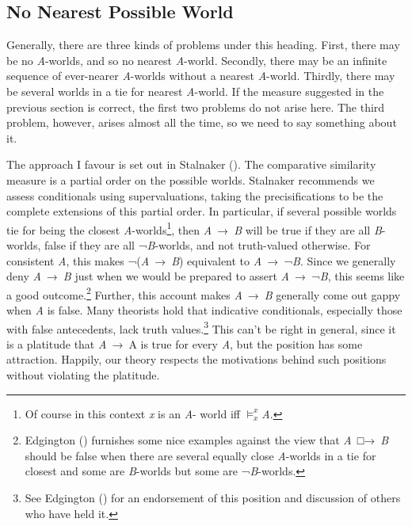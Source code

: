 \documentclass[
  10pt,
  letterpaper,
  DIV=11,
  numbers=noendperiod,
  twoside]{scrartcl}
\begin{document}
\subsection{No Nearest Possible World}\label{no-nearest-possible-world}

Generally, there are three kinds of problems under this heading. First,
there may be no \emph{A}-worlds, and so no nearest \emph{A}-world.
Secondly, there may be an infinite sequence of ever-nearer
\emph{A}-worlds without a nearest \emph{A}-world. Thirdly, there may be
several worlds in a tie for nearest \emph{A}-world. If the measure
suggested in the previous section is correct, the first two problems do
not arise here. The third problem, however, arises almost all the time,
so we need to say something about it.

The approach I favour is set out in Stalnaker
(). The comparative similarity measure
is a partial order on the possible worlds. Stalnaker recommends we
assess conditionals using supervaluations, taking the precisifications
to be the complete extensions of this partial order. In particular, if
several possible worlds tie for being the closest
\emph{A}-worlds\footnote{Of course in this context \emph{x} is an
  \emph{A}- world iff \(\vDash_x^x\)\emph{A}.}, then \emph{A}~→~\emph{B}
will be true if they are all \emph{B}-worlds, false if they are all
¬\emph{B}-worlds, and not truth-valued otherwise. For consistent
\emph{A}, this makes ¬(\emph{A}~→~\emph{B}) equivalent to
\emph{A}~→~¬\emph{B}. Since we generally deny \emph{A}~→~\emph{B} just
when we would be prepared to assert \emph{A}~→~¬\emph{B}, this seems
like a good outcome.\footnote{Edgington
  () furnishes some nice examples
  against the view that \emph{A}~□→~\emph{B} should be false when there
  are several equally close \emph{A}-worlds in a tie for closest and
  some are \emph{B}-worlds but some are ¬\emph{B}-worlds.} Further, this
account makes \emph{A}~→~\emph{B} generally come out gappy when \emph{A}
is false. Many theorists hold that indicative conditionals, especially
those with false antecedents, lack truth values.\footnote{See Edgington
  () for an endorsement of this
  position and discussion of others who have held it.} This can't be
right in general, since it is a platitude that \emph{A}~→~A is true for
every \emph{A}, but the position has some attraction. Happily, our
theory respects the motivations behind such positions without violating
the platitude.
\end{document}
